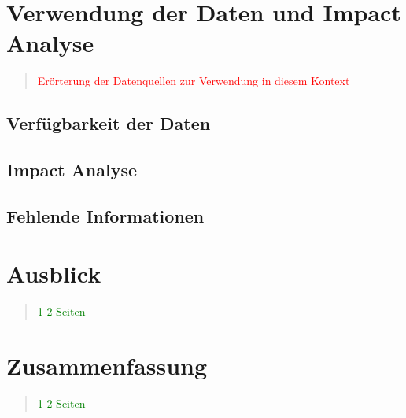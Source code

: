 \chapter{Verwendung der Daten und Impact Analyse}

\begin{quote}
\textcolor{red}{Erörterung der Datenquellen zur Verwendung in diesem Kontext}
\end{quote}

    \section{Verfügbarkeit der Daten}
    \section{Impact Analyse}
    \section{Fehlende Informationen}

\chapter{Ausblick}
\begin{quote}
\textcolor{green}{1-2 Seiten}
\end{quote}

\chapter{Zusammenfassung}
\begin{quote}
\textcolor{green}{1-2 Seiten}
\end{quote}